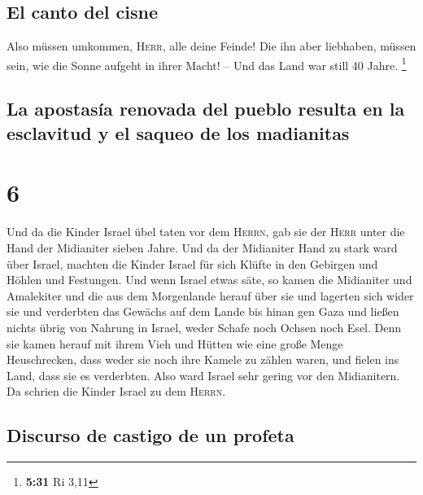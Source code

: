\hypertarget{el-canto-del-cisne}{%
\subsection{El canto del cisne}\label{el-canto-del-cisne}}

 Also müssen umkommen, \textsc{Herr}, alle deine Feinde!
Die ihn aber liebhaben, müssen sein, wie die Sonne aufgeht in ihrer
Macht! -- Und das Land war still 40 Jahre. \footnote{\textbf{5:31} Ri
  3,11}

\hypertarget{la-apostasuxeda-renovada-del-pueblo-resulta-en-la-esclavitud-y-el-saqueo-de-los-madianitas}{%
\subsection{La apostasía renovada del pueblo resulta en la esclavitud y
el saqueo de los
madianitas}\label{la-apostasuxeda-renovada-del-pueblo-resulta-en-la-esclavitud-y-el-saqueo-de-los-madianitas}}

\hypertarget{section-5}{%
\section{6}\label{section-5}}

 Und da die Kinder Israel übel taten vor dem
\textsc{Herrn}, gab sie der \textsc{Herr} unter die Hand der Midianiter
sieben Jahre.  Und da der Midianiter Hand zu stark ward
über Israel, machten die Kinder Israel für sich Klüfte in den Gebirgen
und Höhlen und Festungen.  Und wenn Israel etwas säte, so
kamen die Midianiter und Amalekiter und die aus dem Morgenlande herauf
über sie  und lagerten sich wider sie und verderbten das
Gewächs auf dem Lande bis hinan gen Gaza und ließen nichts übrig von
Nahrung in Israel, weder Schafe noch Ochsen noch Esel. 
Denn sie kamen herauf mit ihrem Vieh und Hütten wie eine große Menge
Heuschrecken, dass weder sie noch ihre Kamele zu zählen waren, und
fielen ins Land, dass sie es verderbten.  Also ward Israel
sehr gering vor den Midianitern. Da schrien die Kinder Israel zu dem
\textsc{Herrn}.

\hypertarget{discurso-de-castigo-de-un-profeta}{%
\subsection{Discurso de castigo de un
profeta}\label{discurso-de-castigo-de-un-profeta}}

